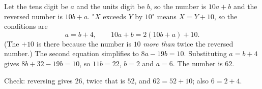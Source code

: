 Let the tens digit be $a$ and the units digit be $b$, so the number is $10a+b$ and the reversed number is $10b+a$. "$X$ exceeds $Y$ by $10$" means $X=Y+10$, so the conditions are
\[a=b+4,\qquad 10a+b=2(10b+a)+10 .\]
(The $+10$ is there because the number is $10$ \emph{more than} twice the reversed number.) The second equation simplifies to $8a-19b=10$. Substituting $a=b+4$ gives $8b+32-19b=10$, so $11b=22$, $b=2$ and $a=6$. The number is $\boxed{62}$.

Check: reversing gives $26$, twice that is $52$, and $62=52+10$; also $6=2+4$.
